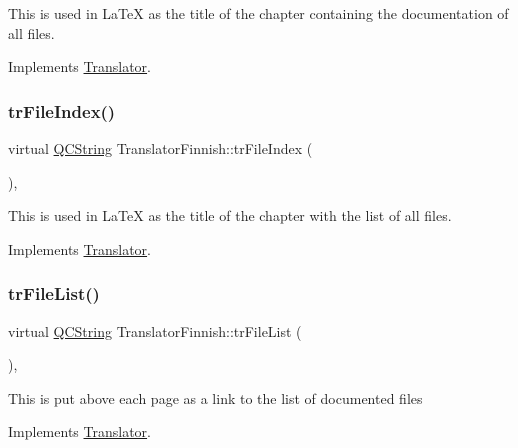 This is used in La\+TeX as the title of the chapter containing the documentation of all files. 

Implements \mbox{\hyperlink{class_translator}{Translator}}.

\mbox{\label{class_translator_finnish_a467423c01d77afab62f2edb2e53f4792}} 
\subsubsection{\texorpdfstring{trFileIndex()}{trFileIndex()}}
{\footnotesize\ttfamily virtual \mbox{\hyperlink{class_q_c_string}{Q\+C\+String}} Translator\+Finnish\+::tr\+File\+Index (\begin{DoxyParamCaption}{ }\end{DoxyParamCaption})\hspace{0.3cm}{\ttfamily [inline]}, {\ttfamily [virtual]}}

This is used in La\+TeX as the title of the chapter with the list of all files. 

Implements \mbox{\hyperlink{class_translator}{Translator}}.

\mbox{\label{class_translator_finnish_a7c5d84f05a6d611e9c783f1c76495c3a}} 
\subsubsection{\texorpdfstring{trFileList()}{trFileList()}}
{\footnotesize\ttfamily virtual \mbox{\hyperlink{class_q_c_string}{Q\+C\+String}} Translator\+Finnish\+::tr\+File\+List (\begin{DoxyParamCaption}{ }\end{DoxyParamCaption})\hspace{0.3cm}{\ttfamily [inline]}, {\ttfamily [virtual]}}

This is put above each page as a link to the list of documented files 

Implements \mbox{\hyperlink{class_translator}{Translator}}.

\mbox{\label{class_translator_finnish_a2b7be9f375bce87166f1401011d295bd}} 
